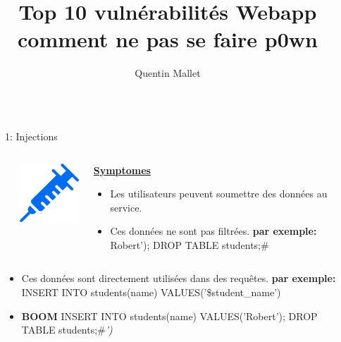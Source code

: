 \documentclass[final,hyperref={pdfpagelabels=false}]{beamer}
\title{\huge Top 10 vulnérabilités Webapp\\comment ne pas se faire p0wn} %
\author{Quentin Mallet} %
\institute{Serli} %
\begin{document}

\begin{frame}[t] %

\begin{columns}[t] %

\begin{column}{.02\textwidth}\end{column} %

\begin{column}{.465\textwidth} %


\begin{block}{1: Injections}

	\begin{columns}[T]

		\begin{column}{.01\textwidth}
		\end{column}
		\begin{column}{.115\textwidth} %
			\includegraphics[scale=1.35]{syringe.png}
		\end{column}

		\begin{column}{.875\textwidth}
			\uline{\textbf{Symptomes}}
			\begin{itemize}
			\item Les utilisateurs peuvent soumettre des données au service.
			\item Ces données ne sont pas filtrées. \textbf{par exemple:} Robert'); DROP TABLE students;\# 
			\end{itemize}
		\end{column}
	\end{columns}
	\begin{itemize}
		\item Ces données sont directement utilisées dans des requêtes. \textbf{par exemple:} INSERT INTO students(name) VALUES('\$student\_name')
		\item \textbf{BOOM} INSERT INTO students(name) VALUES('Robert'); DROP TABLE students;\#\textit{')}
	\end{itemize}


\end{block}
\end{column}
\end{columns}
\end{frame}
\end{document}
